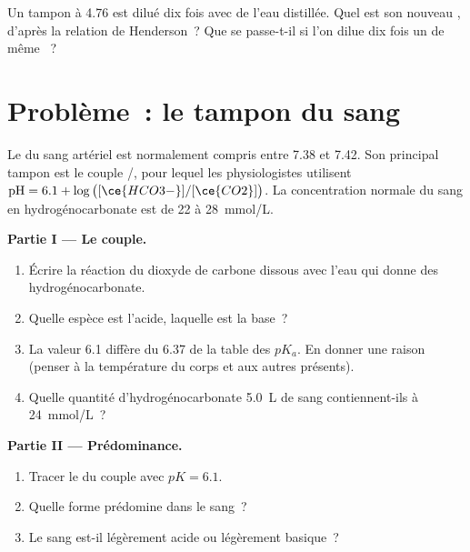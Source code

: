 \begin{exercise}[$\star\star\star$]\label{exo:g12:buffers-predominance:15}
Un tampon à  4.76 est dilué dix fois avec de l'eau distillée. Quel est
son nouveau , d'après la relation de Henderson~? Que se passe-t-il si
l'on dilue dix fois un  de même ~?
\end{exercise}

\section{Problème~: le tampon du sang}

\begin{problem}
\label{pb:g12:buffers-predominance:1}
Le  du sang artériel est normalement compris entre 7.38 et 7.42. Son
principal tampon est le couple /, pour lequel les
physiologistes utilisent
$\mathrm{pH} = 6.1 + \log\big([\ce{HCO3-}]/[\ce{CO2}]\big)$. La
concentration normale du sang en hydrogénocarbonate est de 22 à
\qty{28}{mmol/L}.

\medskip
\noindent\textbf{Partie I --- Le couple.}
\begin{enumerate}
  \item Écrire la réaction du dioxyde de carbone dissous avec l'eau qui
        donne des  hydrogénocarbonate.
  \item Quelle espèce est l'acide, laquelle est la base~?
  \item La valeur 6.1 diffère du 6.37 de la table des $pK_a$. En donner
        une raison (penser à la température du corps et aux autres 
        présents).
  \item Quelle quantité d'hydrogénocarbonate \qty{5.0}{L} de sang
        contiennent-ils à \qty{24}{mmol/L}~?
\end{enumerate}

\medskip
\noindent\textbf{Partie II --- Prédominance.}
\begin{enumerate}[resume]
  \item Tracer le  du couple avec $pK = 6.1$.
  \item Quelle forme prédomine dans le sang~?
  \item Le sang est-il légèrement acide ou légèrement basique~?
\end{enumerate}


\end{problem}
